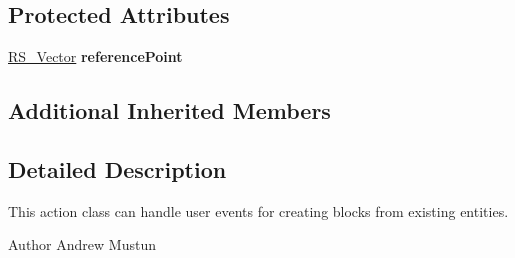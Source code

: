 \subsection*{Protected Attributes}
\begin{DoxyCompactItemize}
\item 
\hypertarget{classRS__ActionBlocksCreate_ac327359c9f5200537bbb1b66e97be0c3}{\hyperlink{classRS__Vector}{R\-S\-\_\-\-Vector} {\bfseries reference\-Point}}\label{classRS__ActionBlocksCreate_ac327359c9f5200537bbb1b66e97be0c3}

\end{DoxyCompactItemize}
\subsection*{Additional Inherited Members}


\subsection{Detailed Description}
This action class can handle user events for creating blocks from existing entities.

\begin{DoxyAuthor}{Author}
Andrew Mustun 
\end{DoxyAuthor}



